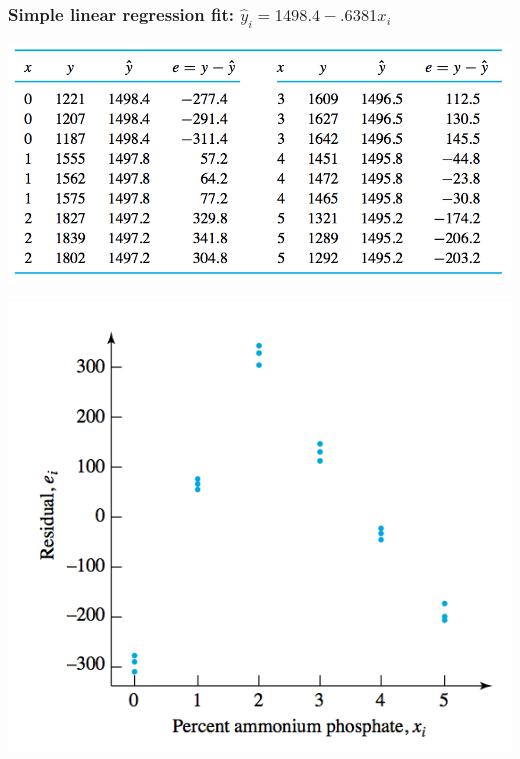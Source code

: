 \documentclass[handout]{beamer}\usepackage{graphicx, color}
\providecommand{\wh}[1]{\widehat{#1}}
\numberwithin{equation}{section}
\begin{document}
\begin{frame}
\frametitle{Simple linear regression fit: $\wh{y}_i = 1498.4 - .6381x_i$}
\begin{center}
 \includegraphics{../../fig/flyashdataresid.png}
\end{center}
\begin{minipage}[b]{.48\linewidth}
 \includegraphics{../../fig/flyashslrfit.png}
\end{minipage}
\begin{minipage}[b]{.48\linewidth}

\end{minipage}
\end{frame}
\end{document}
